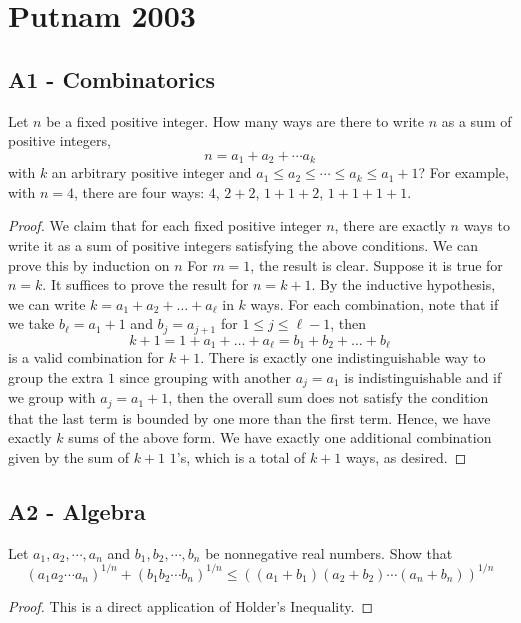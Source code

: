 \documentclass[11pt]{scrartcl}
\newcommand{\<}{\langle}
\renewcommand{\>}{\rangle}
\begin{document}
\pagebreak

\section{Putnam 2003}
\subsection{A1 - Combinatorics}
Let $n$ be a fixed positive integer. How many ways are there to write $n$ as a sum of positive integers,
\[n = a_1 + a_2 + \cdots a_k\]with $k$ an arbitrary positive integer and $a_1 \le a_2 \le \cdots \le a_k \le a_1 + 1$? For example, with $n = 4$, there are four ways: $4$, $2 + 2$, $1 + 1 + 2$, $1 + 1 + 1 + 1$.
\begin{proof}
We claim that for each fixed positive integer $n$, there are exactly $n$ ways to write it as a sum of positive integers satisfying the above conditions.  We can prove this by induction on $n$  For $m = 1$, the result is clear.  Suppose it is true for $n = k$.  It suffices to prove the result for $n = k+1$.  By the inductive hypothesis, we can write $k = a_1 + a_2 + \dots + a_{\ell}$ in $k$ ways.  For each combination, note that if we take $b_\ell =  a_1 + 1$ and $b_j = a_{j+1}$ for $1 \le j \le \ell-1$, then 
$$k+1 = 1 + a_1 + \dots + a_\ell = b_1 + b_2 + \dots + b_{\ell}$$
is a valid combination for $k+1$.  There is exactly one indistinguishable way to group the extra $1$ since grouping with another $a_j = a_1$ is indistinguishable and if we group with $a_j = a_1 + 1$, then the overall sum does not satisfy the condition that the last term is bounded by one more than the first term.  Hence, we have exactly $k$ sums of the above form.  We have exactly one additional combination given by the sum of $k+1$ $1$'s, which is a total of $k+1$ ways, as desired.  

\end{proof}
\pagebreak
\subsection{A2 - Algebra}
Let $a_1, a_2, \cdots , a_n$ and $b_1, b_2,\cdots, b_n$ be nonnegative real numbers. Show that\[(a_1a_2 \cdots a_n)^{1/n}+ (b_1b_2 \cdots b_n)^{1/n} \le ((a_1 + b_1)(a_2 + b_2) \cdots (a_n + b_n))^{1/n}\]
\begin{proof}
This is a direct application of Holder's Inequality.  
\end{proof}
\end{document}
